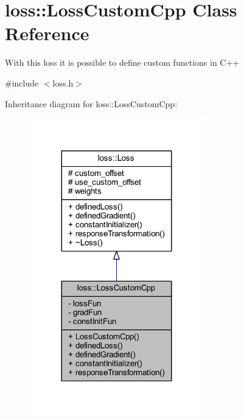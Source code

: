 \hypertarget{classloss_1_1_loss_custom_cpp}{}\section{loss\+:\+:Loss\+Custom\+Cpp Class Reference}
\label{classloss_1_1_loss_custom_cpp}


With this loss it is possible to define custom functions in {\ttfamily C++}  




{\ttfamily \#include $<$loss.\+h$>$}



Inheritance diagram for loss\+:\+:Loss\+Custom\+Cpp\+:\nopagebreak
\begin{figure}[H]
\begin{center}
\leavevmode
\includegraphics[width=215pt]{classloss_1_1_loss_custom_cpp__inherit__graph}
\end{center}
\end{figure}


